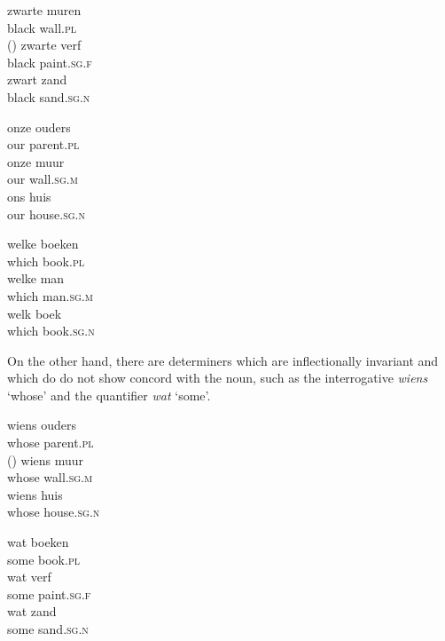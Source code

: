 \documentclass[output=paper,biblatex,babelshorthands,newtxmath,draftmode,colorlinks,citecolor=brown]{langscibook}
\begin{document}
\begin{exe} 
\ex\label{wit} 
\begin{xlist}
\ex
\gll  zwarte muren      \\
      black wall.\textsc{pl} \\\hfill()
\ex
\gll  zwarte verf \\
      black paint.\textsc{sg.f} \\
\ex
\gll  zwart zand \\
      black sand.\textsc{sg.n} \\
\end{xlist}
\ex\label{ons}
\begin{xlist}
\ex
\gll onze ouders     \\
     our parent.\textsc{pl}  \\
\ex
\gll onze muur     \\
     our wall.\textsc{sg.m}  \\
\ex
\gll ons huis     \\
     our house.\textsc{sg.n}  \\
\end{xlist}
\ex\label{welk}
\begin{xlist} 
\ex
\gll welke boeken  \\
     which book.\textsc{pl} \\
\ex
\gll welke man                 \\
     which man.\textsc{sg.m}  \\
\ex
\gll welk boek   \\
     which book.\textsc{sg.n} \\
\end{xlist}
\end{exe} 

\noindent
On the other hand, there are determiners which are inflectionally invariant and which do 
do not show concord with the noun, such as the interrogative \emph{wiens} `whose' 
and the quantifier \emph{wat} `some'. 

\begin{exe} 
\ex\label{wiens}
\begin{xlist} 
\ex
\gll  wiens ouders \\ 
      whose parent.\textsc{pl} \\\hfill()
\ex
\gll  wiens muur \\ 
      whose wall.\textsc{sg.m} \\
\ex
\gll  wiens huis \\ 
      whose house.\textsc{sg.n} \\
\end{xlist}
\ex\label{wat}
\begin{xlist}
\ex
\gll  wat boeken  \\
      some book.\textsc{pl} \\
\ex
\gll  wat verf                  \\
      some paint.\textsc{sg.f} \\
\ex
\gll  wat zand  \\
      some sand.\textsc{sg.n} \\
\end{xlist} 
\end{exe} 
\end{document}
